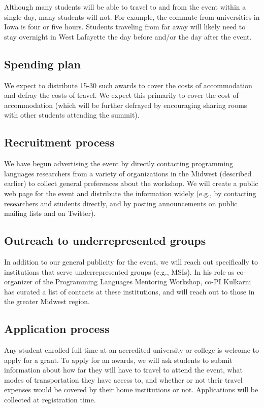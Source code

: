 \documentclass[11pt]{article}
\begin{document}
Although many students will be able to travel to and from the event
within a single day, many 
students will not. For example, the commute from universities 
in Iowa is four or five hours. Students traveling from far away will
likely need to stay overnight in West Lafayette the day before and/or the
day after the event.

\subsection{Spending plan}

We expect to distribute 15-30 such awards to cover the costs of accommodation and defray the costs of travel. We expect this primarily to cover the cost of accommodation (which will be further defrayed by encouraging sharing rooms with other students attending the summit).

\subsection{Recruitment process}

We have begun advertising the event by directly contacting programming
languages researchers from a variety of organizations in the Midwest
(described earlier) to collect general preferences about the workshop. We will create a public web page for the event and distribute the information widely
(e.g., by contacting researchers and students directly, and by posting
announcements on public mailing lists and on Twitter).

\subsection{Outreach to underrepresented groups}

In addition to our general publicity for the event, we will reach out specifically to institutions that serve underrepresented groups (e.g., MSIs). In his role as co-organizer of the Programming Languages Mentoring Workshop, co-PI Kulkarni has curated a list of contacts at these institutions, and will reach out to those in the greater Midwest region.

\subsection{Application process}

Any student enrolled full-time at an accredited
university or college is welcome to apply for a grant.
To apply for an awards, we will ask students
to submit information about how far they will have to travel to attend
the event, what modes of transportation they have access to, and
whether or not their travel expenses would be covered by their home
institutions or not. Applications will be collected at registration time. 
\end{document}
